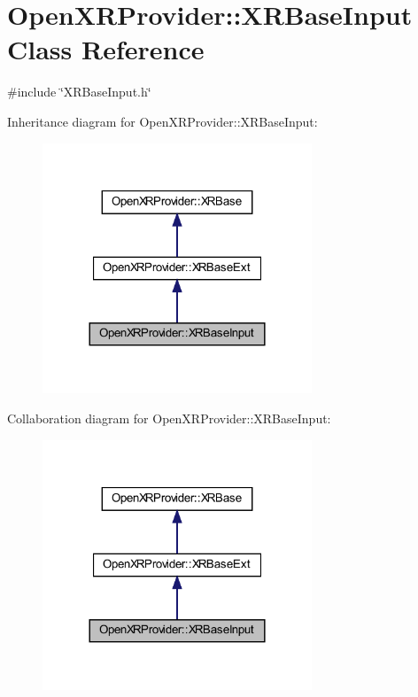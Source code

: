 \hypertarget{class_open_x_r_provider_1_1_x_r_base_input}{}\section{Open\+X\+R\+Provider\+::X\+R\+Base\+Input Class Reference}
\label{class_open_x_r_provider_1_1_x_r_base_input}


{\ttfamily \#include \char`\"{}X\+R\+Base\+Input.\+h\char`\"{}}



Inheritance diagram for Open\+X\+R\+Provider\+::X\+R\+Base\+Input\+:
\nopagebreak
\begin{figure}[H]
\begin{center}
\leavevmode
\includegraphics[width=228pt]{class_open_x_r_provider_1_1_x_r_base_input__inherit__graph}
\end{center}
\end{figure}


Collaboration diagram for Open\+X\+R\+Provider\+::X\+R\+Base\+Input\+:
\nopagebreak
\begin{figure}[H]
\begin{center}
\leavevmode
\includegraphics[width=228pt]{class_open_x_r_provider_1_1_x_r_base_input__coll__graph}
\end{center}
\end{figure}
